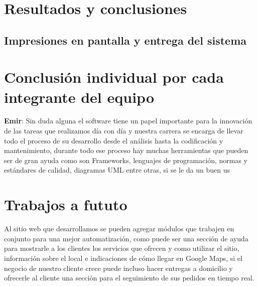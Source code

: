 \section{Resultados y conclusiones}


\subsection{Impresiones en pantalla y entrega del sistema}



\section{Conclusión individual por cada integrante del equipo}
\textbf{Emir}: Sin duda alguna el software tiene un papel importante para la innovación de las tareas que realizamos día con día y nuestra carrera se encarga de llevar todo el proceso de su desarrollo desde el análisis hasta la codificación y mantenimiento, durante todo ese proceso hay muchas herramientas que pueden ser de gran ayuda como son Frameworks, lenguajes de programación, normas y estándares de calidad, diagramas UML entre otras, si se le da un buen us

\section{Trabajos a fututo}
Al sitio web que desarrollamos se pueden agregar módulos que trabajen en conjunto para una mejor automatización, como puede ser una sección de ayuda para mostrarle a los clientes los servicios que ofrecen y como utilizar el sitio, información sobre el local e indicaciones de cómo llegar en Google Maps, si el negocio de nuestro cliente crece puede incluso hacer entregas a domicilio y ofrecerle al cliente una sección para el seguimiento de sus pedidos en tiempo real.


